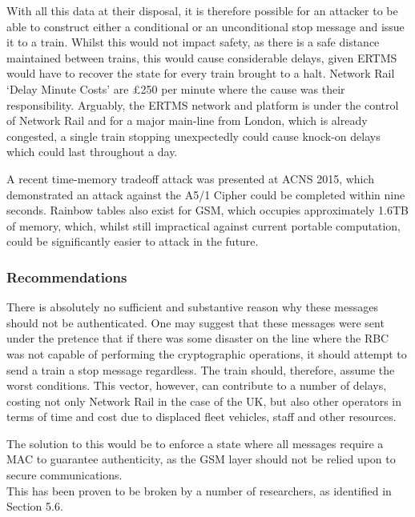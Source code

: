\documentclass[twoside,11pt,a4paper]{article}
\begin{document}
With all this data at their disposal, it is therefore possible for an attacker to be able to construct either a conditional or an unconditional stop message and issue it to a train. Whilst this would not impact safety, as there is a safe distance maintained between trains, this would cause considerable delays, given ERTMS would have to recover the state for every train brought to a halt. Network Rail `Delay Minute Costs' are \pounds250 per minute where the cause was their responsibility. Arguably, the ERTMS network and platform is under the control of Network Rail and for a major main-line from London, which is already congested, a single train stopping unexpectedly could cause knock-on delays which could last throughout a day.

A recent time-memory tradeoff attack was presented at ACNS 2015, which demonstrated an attack against the A5/1 Cipher could be completed within nine seconds. Rainbow tables also exist for GSM, which occupies approximately 1.6TB \citep{Karstensen13a} \citep{SRLabs10a} of memory, which, whilst still impractical against current portable computation, could be significantly easier to attack in the future.

\subsubsection{Recommendations}
There is absolutely no sufficient and substantive reason why these messages should not be authenticated. One may suggest that these messages were sent under the pretence that if there was some disaster on the line where the RBC was not capable of performing the cryptographic operations, it should attempt to send a train a stop message regardless. The train should, therefore, assume the worst conditions. This vector, however, can contribute to a number of delays, costing not only Network Rail in the case of the UK, but also other operators in terms of time and cost due to displaced fleet vehicles, staff and other resources.

The solution to this would be to enforce a state where all messages require a MAC to guarantee authenticity, as the GSM layer should not be relied upon to secure communications.\\This has been proven to be broken by a number of researchers, as identified in Section 5.6.
\end{document}
